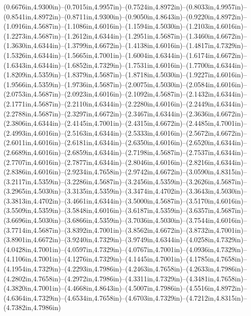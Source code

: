 (0.6676in,4.9300in)--(0.7015in,4.9957in)--(0.7524in,4.8972in)--(0.8033in,4.9957in)--(0.8541in,4.8972in)--(0.8711in,4.9300in)--(0.9050in,4.8643in)--(0.9220in,4.8972in)--(1.0916in,4.5687in)--(1.1086in,4.6016in)--(1.1594in,4.5030in)--(1.2103in,4.6016in)--(1.2273in,4.5687in)--(1.2612in,4.6344in)--(1.2951in,4.5687in)--(1.3460in,4.6672in)--(1.3630in,4.6344in)--(1.3799in,4.6672in)--(1.4138in,4.6016in)--(1.4817in,4.7329in)--(1.5326in,4.6344in)--(1.5665in,4.7001in)--(1.6004in,4.6344in)--(1.6174in,4.6672in)--(1.6343in,4.6344in)--(1.6852in,4.7329in)--(1.7531in,4.6016in)--(1.7700in,4.6344in)--(1.8209in,4.5359in)--(1.8379in,4.5687in)--(1.8718in,4.5030in)--(1.9227in,4.6016in)--(1.9566in,4.5359in)--(1.9736in,4.5687in)--(2.0075in,4.5030in)--(2.0584in,4.6016in)--(2.0753in,4.5687in)--(2.0923in,4.6016in)--(2.1092in,4.5687in)--(2.1432in,4.6344in)--(2.1771in,4.5687in)--(2.2110in,4.6344in)--(2.2280in,4.6016in)--(2.2449in,4.6344in)--(2.2788in,4.5687in)--(2.3297in,4.6672in)--(2.3467in,4.6344in)--(2.3636in,4.6672in)--(2.3806in,4.6344in)--(2.4145in,4.7001in)--(2.4315in,4.6672in)--(2.4485in,4.7001in)--(2.4993in,4.6016in)--(2.5163in,4.6344in)--(2.5333in,4.6016in)--(2.5672in,4.6672in)--(2.6011in,4.6016in)--(2.6181in,4.6344in)--(2.6350in,4.6016in)--(2.6520in,4.6344in)--(2.6689in,4.6016in)--(2.6859in,4.6344in)--(2.7198in,4.5687in)--(2.7537in,4.6344in)--(2.7707in,4.6016in)--(2.7877in,4.6344in)--(2.8046in,4.6016in)--(2.8216in,4.6344in)--(2.8386in,4.6016in)--(2.9234in,4.7658in)--(2.9742in,4.6672in)--(3.0590in,4.8315in)--(3.2117in,4.5359in)--(3.2286in,4.5687in)--(3.2456in,4.5359in)--(3.2626in,4.5687in)--(3.2965in,4.5030in)--(3.3135in,4.5359in)--(3.3474in,4.4702in)--(3.3643in,4.5030in)--(3.3813in,4.4702in)--(3.4661in,4.6344in)--(3.5000in,4.5687in)--(3.5170in,4.6016in)--(3.5509in,4.5359in)--(3.5848in,4.6016in)--(3.6187in,4.5359in)--(3.6357in,4.5687in)--(3.6696in,4.5030in)--(3.6866in,4.5359in)--(3.7036in,4.5030in)--(3.7544in,4.6016in)--(3.7714in,4.5687in)--(3.8392in,4.7001in)--(3.8562in,4.6672in)--(3.8732in,4.7001in)--(3.8901in,4.6672in)--(3.9240in,4.7329in)--(3.9749in,4.6344in)--(4.0258in,4.7329in)--(4.0428in,4.7001in)--(4.0597in,4.7329in)--(4.0767in,4.7001in)--(4.0936in,4.7329in)--(4.1106in,4.7001in)--(4.1276in,4.7329in)--(4.1445in,4.7001in)--(4.1785in,4.7658in)--(4.1954in,4.7329in)--(4.2293in,4.7986in)--(4.2463in,4.7658in)--(4.2633in,4.7986in)--(4.2802in,4.7658in)--(4.2972in,4.7986in)--(4.3311in,4.7329in)--(4.3481in,4.7658in)--(4.3820in,4.7001in)--(4.4668in,4.8643in)--(4.5007in,4.7986in)--(4.5516in,4.8972in)--(4.6364in,4.7329in)--(4.6534in,4.7658in)--(4.6703in,4.7329in)--(4.7212in,4.8315in)--(4.7382in,4.7986in) 